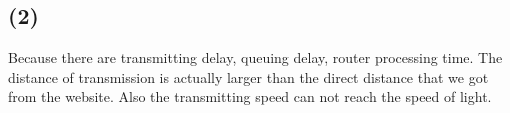 \documentclass[11pt]{article}
\begin{document}
\subsection*{(2)}
Because there are transmitting delay, queuing delay, router processing time. The distance of transmission is actually larger than  the direct distance that we got from the website. Also the transmitting speed can not reach the speed of light.
\label{pg:end-of-p4}

%


\newpage




%







%
\end{document}
